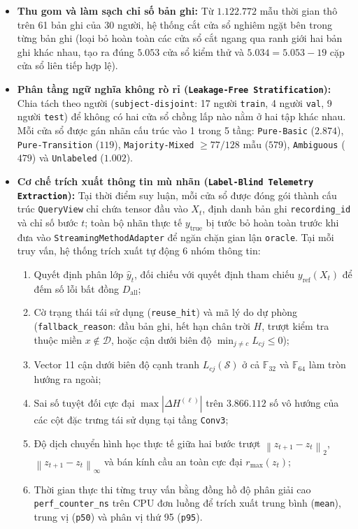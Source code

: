 \documentclass[11pt,a4paper]{article}
\newcommand{\F}{\mathbb{F}}
\newcommand{\norm}[1]{\left\lVert #1\right\rVert}
\newcommand{\abs}[1]{\left\lvert #1\right\rvert}
\newcommand{\code}[1]{{\small\ttfamily\nolinkurl{#1}}}
\newcommand{\Sset}{\mathcal{S}}
\newcommand{\Dset}{\mathcal{D}}
\begin{document}
\begin{itemize}
  \item \textbf{Thu gom và làm sạch chỉ số bản ghi:} Từ $1.122.772$ mẫu thời gian thô trên 61 bản ghi của 30 người, hệ thống cắt cửa sổ nghiêm ngặt bên trong từng bản ghi (loại bỏ hoàn toàn các cửa sổ cắt ngang qua ranh giới hai bản ghi khác nhau, tạo ra đúng $5.053$ cửa sổ kiểm thử và $5.034 = 5.053 - 19$ cặp cửa sổ liên tiếp hợp lệ).
  \item \textbf{Phân tầng ngữ nghĩa không rò rỉ (\code{Leakage-Free Stratification}):} Chia tách theo người (\code{subject-disjoint}: 17 người \code{train}, 4 người \code{val}, 9 người \code{test}) để không có hai cửa sổ chồng lấp nào nằm ở hai tập khác nhau. Mỗi cửa sổ được gán nhãn cấu trúc vào 1 trong 5 tầng: \code{Pure-Basic} ($2.874$), \code{Pure-Transition} ($119$), \code{Majority-Mixed} $\ge 77/128$ mẫu ($579$), \code{Ambiguous} ($479$) và \code{Unlabeled} ($1.002$).
  \item \textbf{Cơ chế trích xuất thông tin mù nhãn (\code{Label-Blind Telemetry Extraction}):} Tại thời điểm suy luận, mỗi cửa sổ được đóng gói thành cấu trúc \code{QueryView} chỉ chứa tensor đầu vào $X_t$, định danh bản ghi \code{recording\_id} và chỉ số bước $t$; toàn bộ nhãn thực tế $y_{\text{true}}$ bị tước bỏ hoàn toàn trước khi đưa vào \code{StreamingMethodAdapter} để ngăn chặn gian lận \code{oracle}. Tại mỗi truy vấn, hệ thống trích xuất tự động 6 nhóm thông tin:
    \begin{enumerate}
      \item Quyết định phân lớp $\hat{y}_t$, đối chiếu với quyết định tham chiếu $y_{\text{ref}}(X_t)$ để đếm số lỗi bất đồng $D_{\text{all}}$;
      \item Cờ trạng thái tái sử dụng (\code{reuse\_hit}) và mã lý do dự phòng (\code{fallback\_reason}: đầu bản ghi, hết hạn chân trời $H$, trượt kiểm tra thuộc miền $x \notin \Dset$, hoặc cận dưới biên độ $\min_{j \neq c} L_{cj} \le 0$);
      \item Vector 11 cận dưới biên độ cạnh tranh $L_{cj}(\Sset)$ ở cả $\F_{32}$ và $\F_{64}$ làm tròn hướng ra ngoài;
      \item Sai số tuyệt đối cực đại $\max \abs{\Delta H^{(\ell)}}$ trên $3.866.112$ số vô hướng của các cột đặc trưng tái sử dụng tại tầng \code{Conv3};
      \item Độ dịch chuyển hình học thực tế giữa hai bước trượt $\norm{z_{t+1} - z_t}_2$, $\norm{z_{t+1} - z_t}_\infty$ và bán kính cầu an toàn cực đại $r_{\max}(z_t)$;
      \item Thời gian thực thi từng truy vấn bằng đồng hồ độ phân giải cao \code{perf\_counter\_ns} trên CPU đơn luồng để trích xuất trung bình (\code{mean}), trung vị (\code{p50}) và phân vị thứ 95 (\code{p95}).
    \end{enumerate}
\end{itemize}
\end{document}

